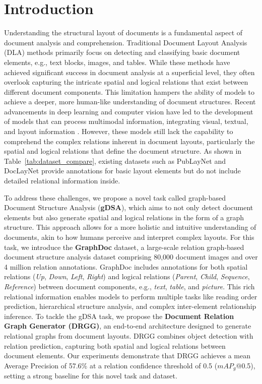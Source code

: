 \section{Introduction}

Understanding the structural layout of documents is a fundamental aspect of document analysis and comprehension. Traditional Document Layout Analysis (DLA) methods primarily focus on detecting and classifying basic document elements, e.g., text blocks, images, and tables. While these methods have achieved significant success in document analysis at a superficial level, they often overlook capturing the intricate spatial and logical relations that exist between different document components. This limitation hampers the ability of models to achieve a deeper, more human-like understanding of document structures. Recent advancements in deep learning and computer vision have led to the development of models that can process multimodal information, integrating visual, textual, and layout information \citep{gu2021unidoc, huang2022layoutlmv3}. However, these models still lack the capability to comprehend the complex relations inherent in document layouts, particularly the spatial and logical relations that define the document structure. As shown in Table~\ref{tab:dataset_compare}, existing datasets such as PubLayNet \citep{zhong2019publaynet} and DocLayNet \citep{doclaynet2022} provide annotations for basic layout elements but do not include detailed relational information inside. 

To address these challenges, we propose a novel task called graph-based Document Structure Analysis (\textbf{gDSA}), which aims to not only detect document elements but also generate spatial and logical relations in the form of a graph structure. This approach allows for a more holistic and intuitive understanding of documents, akin to how humans perceive and interpret complex layouts. For this task, we introduce the \textbf{GraphDoc} dataset, a large-scale relation graph-based document structure analysis dataset comprising 80,000 document images and over 4 million relation annotations. GraphDoc includes annotations for both spatial relations (\textit{Up}, \textit{Down}, \textit{Left}, \textit{Right}) and logical relations (\textit{Parent}, \textit{Child}, \textit{Sequence}, \textit{Reference}) between document components, e.g., \textit{text}, \textit{table}, and \textit{picture}. This rich relational information enables models to perform multiple tasks like reading order prediction, hierarchical structure analysis, and complex inter-element relationship inference. To tackle the gDSA task, we propose the \textbf{Document Relation Graph Generator (DRGG)}, an end-to-end architecture designed to generate relational graphs from document layouts. DRGG combines object detection with relation prediction, capturing both spatial and logical relations between document elements. Our experiments demonstrate that DRGG achieves a mean Average Precision of 57.6\% at a relation confidence threshold of 0.5 ($mAP_g$@0.5), setting a strong baseline for this novel task and dataset.

